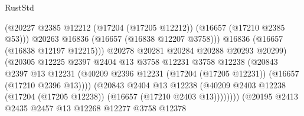 \begin{lexlean}{RustStd}
\begin{coremodule}
                                            (@20227
                                              @2385
                                              @12212
                                              (@17204 (@17205 @12212))
                                              (@16657 (@17210 @2385 @53)))
                                            @20263
                                            @16836
                                            (@16657 (@16838 @12207 @3758)))
                                          @16836
                                          (@16657 (@16838 @12197 @12215)))
                                        @20278
                                        @20281
                                        @20284
                                        @20288
                                        @20293
                                        @20299)
                                      (@20305
                                        @12225
                                        @2397
                                        @2404
                                        @13
                                        @3758
                                        @12231
                                        @3758
                                        @12238
                                        (@20843
                                          @2397
                                          @13
                                          @12231
                                          (@40209
                                            @2396
                                            @12231
                                            (@17204 (@17205 @12231))
                                            (@16657 (@17210 @2396 @13))))
                                        (@20843
                                          @2404
                                          @13
                                          @12238
                                          (@40209
                                            @2403
                                            @12238
                                            (@17204 (@17205 @12238))
                                            (@16657 (@17210 @2403 @13))))))))
                                (@20195
                                  @2413
                                  @2435
                                  @2457
                                  @13
                                  @12268
                                  @12277
                                  @3758
                                  @12378

\end{coremodule}
\end{lexlean}
